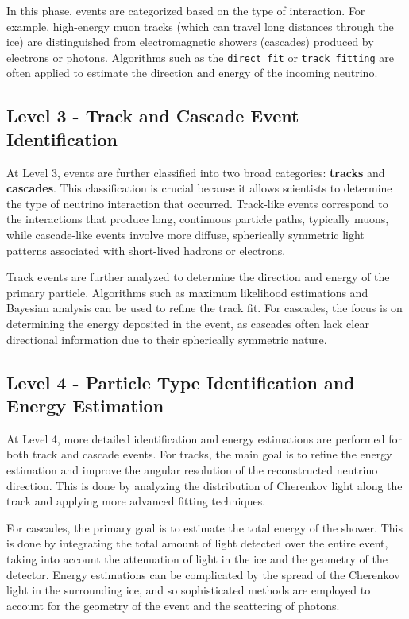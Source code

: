 \documentclass[a4paper,12pt,numbered]{article}
\begin{document}
In this phase, events are categorized based on the type of interaction. For example, high-energy muon tracks (which can travel long distances through the ice) are distinguished from electromagnetic showers (cascades) produced by electrons or photons. Algorithms such as the \texttt{direct fit} or \texttt{track fitting} are often applied to estimate the direction and energy of the incoming neutrino.

\subsection{Level 3 - Track and Cascade Event Identification}
At Level 3, events are further classified into two broad categories: \textbf{tracks} and \textbf{cascades}. This classification is crucial because it allows scientists to determine the type of neutrino interaction that occurred. Track-like events correspond to the interactions that produce long, continuous particle paths, typically muons, while cascade-like events involve more diffuse, spherically symmetric light patterns associated with short-lived hadrons or electrons.

Track events are further analyzed to determine the direction and energy of the primary particle. Algorithms such as maximum likelihood estimations and Bayesian analysis can be used to refine the track fit. For cascades, the focus is on determining the energy deposited in the event, as cascades often lack clear directional information due to their spherically symmetric nature.

\subsection{Level 4 - Particle Type Identification and Energy Estimation}
At Level 4, more detailed identification and energy estimations are performed for both track and cascade events. For tracks, the main goal is to refine the energy estimation and improve the angular resolution of the reconstructed neutrino direction. This is done by analyzing the distribution of Cherenkov light along the track and applying more advanced fitting techniques.

For cascades, the primary goal is to estimate the total energy of the shower. This is done by integrating the total amount of light detected over the entire event, taking into account the attenuation of light in the ice and the geometry of the detector. Energy estimations can be complicated by the spread of the Cherenkov light in the surrounding ice, and so sophisticated methods are employed to account for the geometry of the event and the scattering of photons.
\end{document}
